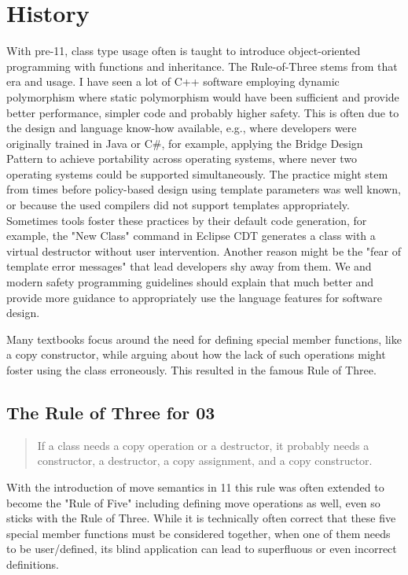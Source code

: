 \documentclass[ebook,11pt,article]{memoir}
\begin{document}
\chapter{History}
With pre-\Cpp{}11, class type usage often is taught to introduce object-oriented programming with  functions and inheritance. 
The Rule-of-Three stems from that era and usage\cite{Meyers2005}. 
I have seen a lot of C++ software employing dynamic polymorphism where static polymorphism would have been sufficient and provide better performance, simpler code and probably higher safety. 
This is often due to the design and language know-how available, e.g., where developers were originally trained in Java or C\#, for example, applying the Bridge Design Pattern \cite{GoF} to achieve portability across operating systems, where never two operating systems could be supported simultaneously. 
The practice might stem from times before policy-based design using template parameters was well known, or because the used compilers did not support templates appropriately. 
Sometimes tools foster these practices by their default code generation, for example, the "New Class" command in Eclipse CDT generates a class with a virtual destructor without user intervention.
Another reason might be the "fear of template error messages" that lead developers shy away from them. We and modern \Cpp{} safety programming guidelines should explain that much better and provide more guidance to appropriately use the language features for software design.

Many textbooks focus around the need for defining special member functions, like a copy constructor, while arguing about how the lack of such operations might foster using the class erroneously. This resulted in the famous Rule of Three\cite{Stroustrup2000}.

\section{The Rule of Three for \Cpp{}03}

\begin{quotation}
{If a class needs a copy operation or a destructor, it probably needs a constructor, a destructor, a copy assignment, and a copy constructor.}
\cite{Stroustrup2000}
\end{quotation}

With the introduction of move semantics in \Cpp{}11 this rule was often extended to become the "Rule of Five" including defining move operations as well, even so \cite{Stroustrup2013} sticks with the Rule of Three. 
While it is technically often correct that these five special member functions must be considered together, when one of them needs to be user/defined, its blind application can lead to superfluous or even incorrect definitions. 
\end{document}
